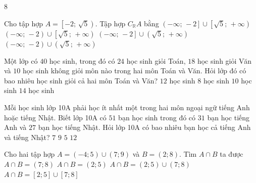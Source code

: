 \begin{indapan}{8}
\begin{ex}%
	Cho tập hợp $A=\left[ -2;\,\sqrt{5} \right)$. Tập hợp $C_{\mathbb{R}}A$ bằng
	\choice
	{$\left( -\infty ;\,-2 \right]\cup \left[ \sqrt{5};\,+\infty \right)$}
	{\True $\left( -\infty ;\,-2 \right)\cup \left[ \sqrt{5};\,+\infty \right)$}
	{$\left( -\infty ;\,-2 \right]\cup \left( \sqrt{5};\,+\infty \right)$}
	{$\left( -\infty ;\,-2 \right)\cup \left( \sqrt{5};\,+\infty \right)$}
	\loigiai{
		Ta có $C_{\mathbb{R}}A=\Bbb{R}\setminus A=\left( -\infty ;\,-2 \right)\cup \left[ \sqrt{5};\,+\infty \right).$
	}
\end{ex}
\begin{ex}%
	Một lớp có $40$ học sinh, trong đó có $24$ học sinh giỏi Toán, $18$ học sinh giỏi Văn và $10$ học
	sinh không giỏi môn nào trong hai môn Toán và Văn. Hỏi lớp đó có bao nhiêu học sinh giỏi cả hai môn
	Toán và Văn?
	\choice
	{\True $12$ học sinh}
	{$8$ học sinh}
	{$10$ học sinh}
	{$14$ học sinh}
\end{ex}
\begin{ex}%
	Mỗi học sinh lớp 10A phải học ít nhất một trong hai môn ngoại ngữ tiếng Anh hoặc tiếng Nhật. Biết lớp 10A có $51$ bạn học sinh trong đó có $31$ bạn học tiếng Anh và $27$ bạn học tiếng Nhật. Hỏi lớp 10A có bao nhiêu bạn học cả tiếng Anh và tiếng Nhật?
	\choice
	{\True $7$}
	{$9$}
	{$5$}
	{$12$}
\end{ex}
\begin{ex}%
	Cho hai tập hợp $A=(-4;5) \cup (7;9)$ và $B=(2;8)$. Tìm $A\cap B$ ta được
	\choice
	{$A \cap B=(7;8)$}
	{$A \cap B=(2;5)$}
	{\True $A \cap B=(2;5) \cup (7;8)$}
	{$A \cap B=[2;5] \cup [7;8]$}
\end{ex}


\end{indapan}
